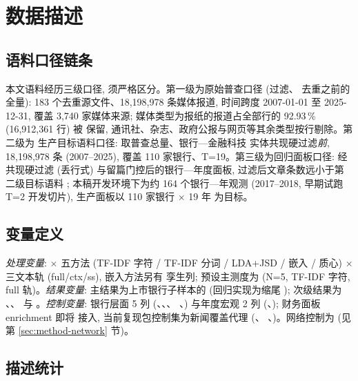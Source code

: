 \section{数据描述}\label{sec:data}

\subsection{语料口径链条}
本文语料经历三级口径, 须严格区分。第一级为原始普查口径 (过滤、
去重之前的全量): 183 个去重源文件、18{,}198{,}978 条媒体报道,
时间跨度 2007-01-01 至 2025-12-31, 覆盖 3{,}740 家媒体来源;
媒体类型为报纸的报道占全部行的 92.93\,\% (16{,}912{,}361 行) 被
保留, 通讯社、杂志、政府公报与网页等其余类型按行剔除。第二级为
生产目标语料口径: 取普查总量、银行—金融科技
实体共现硬过滤\emph{前}, 18{,}198{,}978 条 (2007--2025), 覆盖
110 家银行、T=19。第三级为回归面板口径: 经共现硬过滤 (丢行式)
与留篇门控后的银行—年度面板, 过滤后文章条数远小于第二级目标语料
; 本稿开发环境下为约 164 个银行—年观测
(2017--2018, 早期试跑 T=2 开发切片), 生产面板以 110 家银行 $\times$ 19 年
为目标。

\subsection{变量定义}
\emph{处理变量}: 
$\times$ 五方法 (TF-IDF 字符 / TF-IDF 分词 / LDA+JSD / 嵌入 /
质心) $\times$ 三文本轨 (full/ctx/ss), 嵌入方法另有 
孪生列; 预设主测度为  (N=5, TF-IDF 字符,
full 轨)。\emph{结果变量}: 主结果为上市银行子样本的
 (回归实现为缩尾 ); 次级结果为
、、 与
。\emph{控制变量}: 银行层面 5 列
(、、、
、) 与年度宏观 2 列
(、); 财务面板 enrichment 即将
接入, 当前复现包控制集为新闻覆盖代理 (、
、)。网络控制为
 (见第 \ref{sec:method-network} 节)。

\subsection{描述统计}

